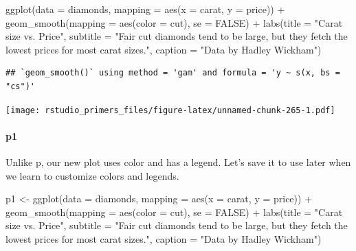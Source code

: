 \documentclass[
]{article}
\newenvironment{Shaded}{\begin{snugshade}}{\end{snugshade}}
\newcommand{\AttributeTok}[1]{\textcolor[rgb]{0.77,0.63,0.00}{#1}}
\newcommand{\ConstantTok}[1]{\textcolor[rgb]{0.00,0.00,0.00}{#1}}
\newcommand{\FunctionTok}[1]{\textcolor[rgb]{0.00,0.00,0.00}{#1}}
\newcommand{\NormalTok}[1]{#1}
\newcommand{\OtherTok}[1]{\textcolor[rgb]{0.56,0.35,0.01}{#1}}
\newcommand{\SpecialCharTok}[1]{\textcolor[rgb]{0.00,0.00,0.00}{#1}}
\newcommand{\StringTok}[1]{\textcolor[rgb]{0.31,0.60,0.02}{#1}}
\begin{document}
\begin{Shaded}
\begin{Highlighting}[]
\FunctionTok{ggplot}\NormalTok{(}\AttributeTok{data =}\NormalTok{ diamonds, }\AttributeTok{mapping =} \FunctionTok{aes}\NormalTok{(}\AttributeTok{x =}\NormalTok{ carat, }\AttributeTok{y =}\NormalTok{ price)) }\SpecialCharTok{+}
  \FunctionTok{geom\_smooth}\NormalTok{(}\AttributeTok{mapping =} \FunctionTok{aes}\NormalTok{(}\AttributeTok{color =}\NormalTok{ cut), }\AttributeTok{se =} \ConstantTok{FALSE}\NormalTok{) }\SpecialCharTok{+} 
  \FunctionTok{labs}\NormalTok{(}\AttributeTok{title =} \StringTok{"Carat size vs. Price"}\NormalTok{,}
       \AttributeTok{subtitle =} \StringTok{"Fair cut diamonds tend to be large, but they fetch the lowest prices for most carat sizes."}\NormalTok{,}
       \AttributeTok{caption =} \StringTok{"Data by Hadley Wickham"}\NormalTok{)}
\end{Highlighting}
\end{Shaded}

\begin{verbatim}
## `geom_smooth()` using method = 'gam' and formula = 'y ~ s(x, bs = "cs")'
\end{verbatim}

\texttt{[image: rstudio\_primers\_files/figure-latex/unnamed-chunk-265-1.pdf]}

\hypertarget{p1}{%
\paragraph{p1}\label{p1}}

Unlike p, our new plot uses color and has a legend. Let's save it to use
later when we learn to customize colors and legends.

\begin{Shaded}
\begin{Highlighting}[]
\NormalTok{p1 }\OtherTok{\textless{}{-}} \FunctionTok{ggplot}\NormalTok{(}\AttributeTok{data =}\NormalTok{ diamonds, }\AttributeTok{mapping =} \FunctionTok{aes}\NormalTok{(}\AttributeTok{x =}\NormalTok{ carat, }\AttributeTok{y =}\NormalTok{ price)) }\SpecialCharTok{+}
  \FunctionTok{geom\_smooth}\NormalTok{(}\AttributeTok{mapping =} \FunctionTok{aes}\NormalTok{(}\AttributeTok{color =}\NormalTok{ cut), }\AttributeTok{se =} \ConstantTok{FALSE}\NormalTok{) }\SpecialCharTok{+} 
  \FunctionTok{labs}\NormalTok{(}\AttributeTok{title =} \StringTok{"Carat size vs. Price"}\NormalTok{,}
       \AttributeTok{subtitle =} \StringTok{"Fair cut diamonds tend to be large, but they fetch the lowest prices for most carat sizes."}\NormalTok{,}
       \AttributeTok{caption =} \StringTok{"Data by Hadley Wickham"}\NormalTok{)}
\end{Highlighting}
\end{Shaded}
\end{document}
